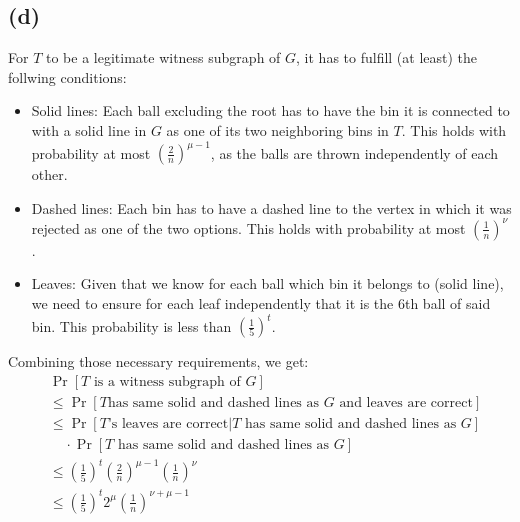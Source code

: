 \documentclass[a4paper,german]{article}
\begin{document}
\subsection*{(d)}
	For \(T\) to be a legitimate witness subgraph of \(G\), it has to fulfill (at least) the follwing conditions:
	\begin{itemize}
	\item Solid lines:
		Each ball excluding the root has to have the bin it is connected to with a solid line in \(G\) as one of its two neighboring bins in \(T\). This holds with probability at most \((\frac{2}{n})^{\mu -1}\), as the balls are thrown independently of each other.
	\item Dashed lines: Each bin has to have a dashed line to the vertex in which it was rejected as one of the two options. This holds with probability at most \((\frac{1}{n})^{\nu}\).
	\item Leaves: Given that we know for each ball which bin it belongs to (solid line), we need to ensure for each leaf independently that it is the 6th ball of said bin. This probability is less than \((\frac{1}{5})^t\).
	\end{itemize}
	Combining those necessary requirements, we get:
	\begin{align*}
		&\Pr[T \text{ is a witness subgraph of } G] \\
		&\leq \Pr[T \text{has same solid and dashed lines as \(G\) and leaves are correct}] \\
		&\leq \Pr[T \text{'s leaves are correct} | T \text{ has same solid and dashed lines as } G] \\
		&\ \ \ \ \  \cdot\Pr [T \text{ has same solid and dashed lines as } G] \\
		&\leq (\frac{1}{5})^t (\frac{2}{n})^{\mu -1} (\frac{1}{n})^{\nu} \\
		&\leq  (\frac{1}{5})^t 2^{\mu} (\frac{1}{n})^{\nu + \mu -1}
	\end{align*}
\end{document}
